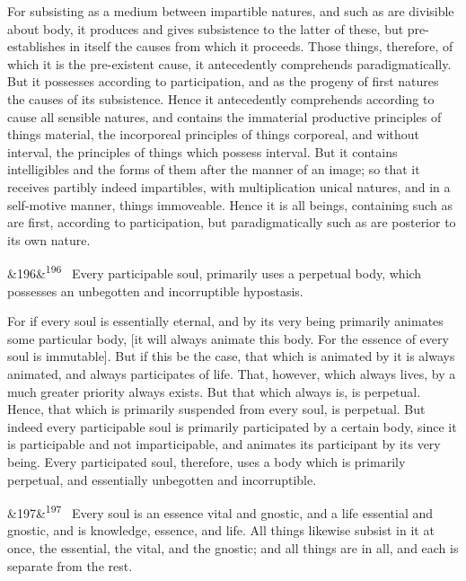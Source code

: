 \documentclass[12pt]{article}
\newcommand{\para}[1][]{\par\noindent\ifx&#1&\else\textsuperscript{\footnotesize #1}~\fi}
\begin{document}
For subsisting as a medium between impartible natures, and such as are divisible about body, it produces and gives subsistence to the latter of these, but pre-establishes in itself the causes from which it proceeds. Those things, therefore, of which it is the pre-existent cause, it antecedently comprehends paradigmatically. But it possesses according to participation, and as the progeny of first natures the causes of its subsistence. Hence it antecedently comprehends according to cause all sensible natures, and contains the immaterial productive principles of things material, the incorporeal principles of things corporeal, and without interval, the principles of things which possess interval. But it contains intelligibles and the forms of them after the manner of an image; so that it receives partibly indeed impartibles, with multiplication unical natures, and in a self-motive manner, things immoveable. Hence it is all beings, containing such as are first, according to participation, but paradigmatically such as are posterior to its own nature.

\para[196] Every participable soul, primarily uses a perpetual body, which possesses an unbegotten and incorruptible hypostasis.

For if every soul is essentially eternal, and by its very being primarily animates some particular body, [it will always animate this body. For the essence of every soul is immutable]. But if this be the case, that which is animated by it is always animated, and always participates of life. That, however, which always lives, by a much greater priority always exists. But that which always is, is perpetual. Hence, that which is primarily suspended from every soul, is perpetual. But indeed every participable soul is primarily participated by a certain body, since it is participable and not imparticipable, and animates its participant by its very being. Every participated soul, therefore, uses a body which is primarily perpetual, and essentially unbegotten and incorruptible.

\para[197] Every soul is an essence vital and gnostic, and a life essential and gnostic, and is knowledge, essence, and life. All things likewise subsist in it at once, the essential, the vital, and the gnostic; and all things are in all, and each is separate from the rest.
\end{document}
